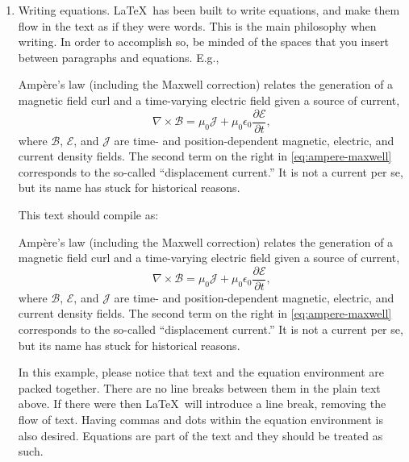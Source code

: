 \begin{enumerate}
  \item Writing equations. \LaTeX\ has been built to write equations, and make them flow in the text as if they were words. This is the main philosophy when writing. In order to accomplish so, be minded of the spaces that you insert between paragraphs and equations. E.g.,
  
  \begin{verbnobox}[\small]
    Ampère's law (including the Maxwell correction) relates the generation 
    of a magnetic field curl and a time-varying electric field given a 
    source of current,
    \begin{equation}
      \nabla \times \boldsymbol{\mathcal{B}} = 
      \mu_0 \boldsymbol{\mathcal{J}} + 
      \mu_0 \epsilon_0 \frac{\partial\boldsymbol{\mathcal{E}}}{\partial t},
    \end{equation}
    where $\boldsymbol{\mathcal{B}}$, $\boldsymbol{\mathcal{E}}$, 
    and $\boldsymbol{\mathcal{J}}$ are time- and position-dependent 
    magnetic, electric, and current density fields. 
    The second term on the right in 
    \cref{eq:ampere-maxwell} corresponds to the so-called 
    ``displacement current.'' It is not a current per se, but its name 
    has stuck for historical reasons.
  \end{verbnobox}
  
  This text should compile as:

  Ampère's law (including the Maxwell correction) relates the generation of a magnetic field curl and a time-varying electric field given a source of current,
  \begin{equation}
    \nabla \times \boldsymbol{\mathcal{B}} = \mu_0 \boldsymbol{\mathcal{J}} + \mu_0 \epsilon_0 \frac{\partial \boldsymbol{\mathcal{E}}}{\partial t}, \label{eq:ampere-maxwell}
  \end{equation}
  where $\boldsymbol{\mathcal{B}}$, $\boldsymbol{\mathcal{E}}$, and $\boldsymbol{\mathcal{J}}$ are time- and position-dependent magnetic, electric, and current density fields. The second term on the right in \cref{eq:ampere-maxwell} corresponds to the so-called ``displacement current.'' It is not a current per se, but its name has stuck for historical reasons.

  In this example, please notice that text and the equation environment are packed together. There are no line breaks between them in the plain text above. If there were then \LaTeX\ will introduce a line break, removing the flow of text. Having commas and dots within the equation environment is also desired. Equations are part of the text and they should be treated as such.
  

\end{enumerate}
